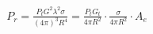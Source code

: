 \documentclass[preview]{standalone}
\begin{document}
\begin{align*}
P_r = \frac{P_t G^2 \lambda^2 \sigma}{(4 \pi)^3 R^4} = \frac{P_t G_t}{4 \pi R^2} \cdot \frac{\sigma}{4 \pi R^2} \cdot A_e
\end{align*}
\end{document}
